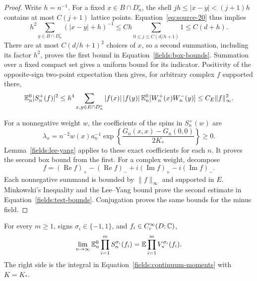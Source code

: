 \begin{proof}
Write $h=n^{-1}$.  For a fixed $x\in B\cap D_n^\circ$,
the shell $jh\leq|x-y|<(j+1)h$ contains at most $C(j+1)$
lattice points.  Equation~\eqref{eq:source-20} thus implies
\[
 h^2\sum_{y\in B\cap D_n^\circ}(|x-y|+h)^{-1}
   \leq Ch\sum_{0\leq j\leq C(d/h+1)}1
   \leq C(d+h).
\]
There are at most $C(d/h+1)^2$ choices of $x$, so a second
summation, including its factor $h^2$, proves the first bound
in Equation~\eqref{fields:box-bounds}.  Summation over a fixed
compact set gives a uniform bound for its indicator.  Positivity
of the opposite-sign two-point expectation then gives, for
arbitrary complex $f$ supported there,
\[
 \mathbb E_n^0|S_n^+(f)|^2
 \leq h^4\sum_{x,y\in E\cap D_n^\circ}
       |f(x)|\,|f(y)|\,
            \mathbb E_n^0[W_n^+(x)W_n^-(y)]
 \leq C_E\|f\|_\infty^2.
\]

For a nonnegative weight $w$, the coefficients of the spins in
$S_n^+(w)$ are
\[
 \lambda_x=n^{-2}w(x)a_n^{-1}
       \exp\left\{\frac{G_n(x,x)-G_n(0,0)}{2K_*}\right\}\geq0.
\]
Lemma~\ref{fields:lee-yang} applies to these exact coefficients
for each $n$.  It proves the second box bound from the first.
For a complex weight, decompose
\[
 f=(\operatorname{Re}f)_+-(\operatorname{Re}f)_-
       +i(\operatorname{Im}f)_+-i(\operatorname{Im}f)_-.
\]
Each nonnegative summand is bounded by $\|f\|_\infty$ and
supported in $E$.  Minkowski's Inequality and the Lee--Yang
bound prove the second estimate in
Equation~\eqref{fields:test-bounds}.  Conjugation proves the
same bounds for the minus field.
\end{proof}

\begin{proposition}
\label{fields:moments}
For every $m\geq1$, signs $\sigma_i\in\{-1,1\}$, and
$f_i\in C_c^\infty(D;\mathbb C)$,
\begin{equation}\label{fields:lattice-moment-limit}
 \lim_{n\to\infty}\mathbb E_n^0\prod_{i=1}^m S_n^{\sigma_i}(f_i)
       =\mathbb E\prod_{i=1}^m V_*^{\sigma_i}(f_i).
\end{equation}
The right side is the integral in
Equation~\eqref{fields:continuum-moments} with $K=K_*$.
\end{proposition}

